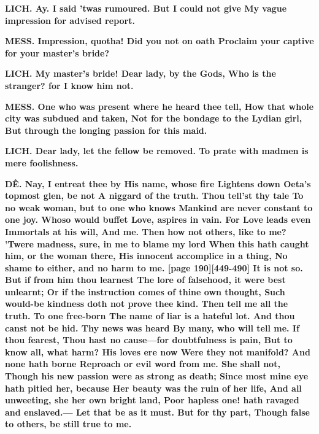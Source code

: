 \documentclass[11pt,letter]{book}
\begin{document}
\par \textbf{LICH. Ay. I said ’twas rumoured. But I could not give My vague impression for advised report.}
\par 

\par \textbf{MESS. Impression, quotha! Did you not on oath Proclaim your captive for your master’s bride?}
\par 

\par \textbf{LICH. My master’s bride! Dear lady, by the Gods, Who is the stranger? for I know him not.}
\par 

\par \textbf{MESS. One who was present where he heard thee tell, How that whole city was subdued and taken, Not for the bondage to the Lydian girl, But through the longing passion for this maid.}
\par 

\par \textbf{LICH. Dear lady, let the fellow be removed. To prate with madmen is mere foolishness.}
\par 

\par \textbf{DÊ. Nay, I entreat thee by His name, whose fire Lightens down Oeta’s topmost glen, be not A niggard of the truth. Thou tell’st thy tale To no weak woman, but to one who knows Mankind are never constant to one joy. Whoso would buffet Love, aspires in vain. For Love leads even Immortals at his will, And me. Then how not others, like to me? ’Twere madness, sure, in me to blame my lord When this hath caught him, or the woman there, His innocent accomplice in a thing, No shame to either, and no harm to me. [page 190][449-490] It is not so. But if from him thou learnest The lore of falsehood, it were best unlearnt; Or if the instruction comes of thine own thought, Such would-be kindness doth not prove thee kind. Then tell me all the truth. To one free-born The name of liar is a hateful lot. And thou canst not be hid. Thy news was heard By many, who will tell me. If thou fearest, Thou hast no cause—for doubtfulness is pain, But to know all, what harm? His loves ere now Were they not manifold? And none hath borne Reproach or evil word from me. She shall not, Though his new passion were as strong as death; Since most mine eye hath pitied her, because Her beauty was the ruin of her life, And all unweeting, she her own bright land, Poor hapless one! hath ravaged and enslaved.— Let that be as it must. But for thy part, Though false to others, be still true to me.}
\par 
\end{document}
